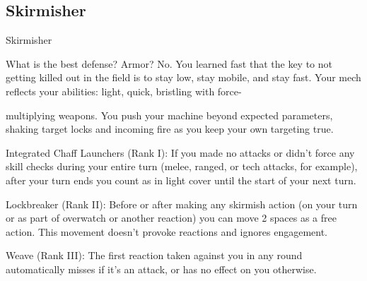 \subsection{Skirmisher}

                                                   Skirmisher

What is the best defense? Armor? No. You learned fast that the key to not getting killed out in the field is to
stay low, stay mobile, and stay fast. Your mech reflects your abilities: light, quick, bristling with force-

multiplying weapons. You push your machine beyond expected parameters, shaking target locks and
incoming fire as you keep your own targeting true.

Integrated Chaff Launchers (Rank I): If you made no attacks or didn’t force any skill checks
during your entire turn (melee, ranged, or tech attacks, for example), after your turn ends you
count as in light cover until the start of your next turn.

Lockbreaker (Rank II): Before or after making any skirmish action (on your turn or as part of
overwatch or another reaction) you can move 2 spaces as a free action. This movement doesn’t
provoke reactions and ignores engagement.

Weave (Rank III): The first reaction taken against you in any round automatically misses if it’s an
attack, or has no effect on you otherwise.